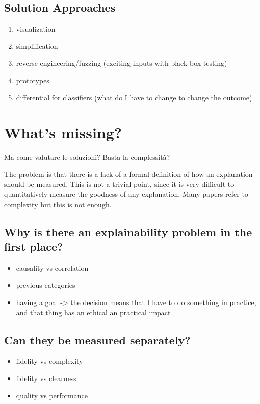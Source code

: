 \documentclass[conference]{IEEEtran}
\begin{document}
\subsection{Solution Approaches}

\begin{enumerate}
    \item visualization
    \item simplification
    \item reverse engineering/fuzzing (exciting inputs with black box testing)
    \item prototypes
    \item differential for classifiers (what do I have to change to change the
          outcome)
\end{enumerate}

\section{What's missing?}
\label{sec:notconsidered}


Ma come valutare le soluzioni? Basta la complessità?

The problem is that there is a lack of a formal definition of how an explanation
should be measured. This is not a trivial point, since it is very difficult to
quantitatively measure the goodness of any explanation. Many papers refer to
complexity but this is not enough.

\subsection{Why is there an explainability problem in the first place?}

\begin{itemize}
    \item causality vs correlation
    \item previous categories
    \item having a goal -> the decision means that I have to do something in
          practice, and that thing has an ethical an practical impact
\end{itemize}


\subsection{Can they be measured separately?}

\begin{itemize}
    \item fidelity vs complexity
    \item fidelity vs clearness
    \item quality vs performance
\end{itemize}
\end{document}
